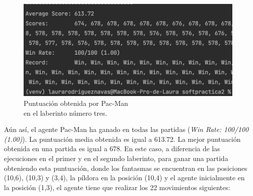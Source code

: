 \documentclass[11pt]{exam}
\begin{document}
\begin{figure}[H]
	\centering
	\includegraphics[scale=0.6]{result_lab3}
	\caption{Puntuación obtenida por Pac-Man \\ en el laberinto número tres.}
	\label{result_lab3}
\end{figure}

Aún así, el agente Pac-Man ha ganado en todas las partidas (\textit{Win Rate: 100/100 (1.00)}). La puntuación media obtenida es igual a 613.72. La mejor puntuación obtenida en una partida es igual a 678. En este caso, a diferencia de las ejecuciones en el primer y en el segundo laberinto, para ganar una partida obteniendo esta puntuación, donde los fantasmas se encuentran en las posiciones (10,6), (10,3) y (3,4), la píldora en la posición (10,4) y el agente inicialmente en la posición (1,3), el agente tiene que realizar los 22 movimientos siguientes:
\vspace*{2mm}
\end{document}
